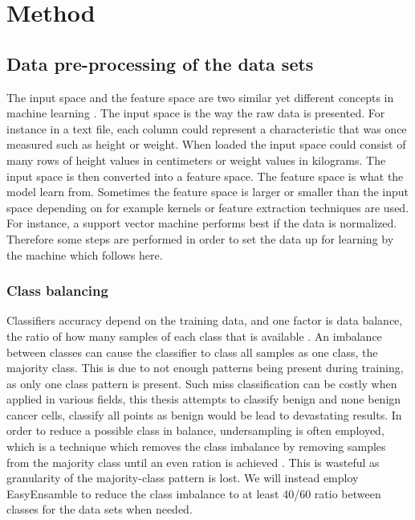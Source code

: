 \documentclass[a4paper,twoside]{bth}
\begin{document}
\chapter{Method}

\section{Data pre-processing of the data sets}

The input space and the feature space are two similar yet different concepts in machine learning \cite{Flach:2012:MLA:2490546}. The input space is the way the raw data is presented. For instance in a text file, each column could represent a characteristic that was once measured such as height or weight. When loaded the input space could consist of many rows of height values in centimeters or weight values in kilograms. The input space is then converted into a feature space. The feature space is what the model learn from. Sometimes the feature space is larger or smaller than the input space depending on for example kernels or feature extraction techniques are used. For instance, a support vector machine performs best if the data is normalized. Therefore some steps are performed in order to set the data up for learning by the machine which follows here.

\subsection{Class balancing}
Classifiers accuracy depend on the training data, and one factor is data balance, the ratio of how many samples of each class that is available \cite{Chawla:2004:ESI:1007730.1007733}. An imbalance between classes can cause the classifier to class all samples as one class, the majority class. This is due to not enough patterns being present during training, as only one class pattern is present\cite{Chawla:2004:ESI:1007730.1007733}. Such miss classification can be costly when applied in various fields, this thesis attempts to classify benign and none benign cancer cells, classify all points as benign would be lead to devastating results. In order to reduce a possible class in balance, undersampling is often employed, which is a technique which removes the class imbalance by removing samples from the majority class until an even ration is achieved \cite{ensamble}. This is wasteful as granularity of the majority-class pattern is lost. We will instead employ EasyEnsamble to reduce the class imbalance to at least 40/60 ratio between classes for the data sets when needed.
\end{document}
